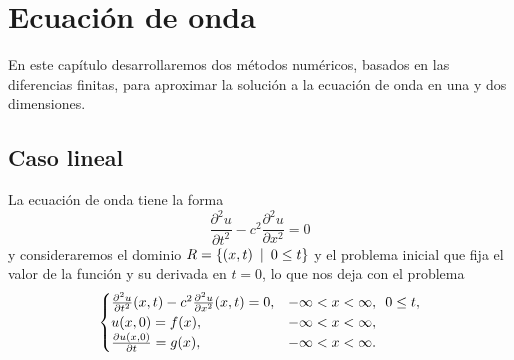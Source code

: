\chapter{Ecuación de onda}
\label{cap:wave}
\begin{resumen}
	En este capítulo desarrollaremos dos métodos numéricos, basados en las diferencias finitas, para aproximar la solución a la ecuación de onda en una  y dos dimensiones.
\end{resumen}

\section{Caso lineal}
La ecuación de onda tiene la forma
\begin{equation}
	\frac{\partial^2u}{\partial t^2} - c^2\frac{\partial^2u}{\partial x^2} = 0
\end{equation}
y consideraremos el dominio $R=\{(x,t) \hspace{5px} | \hspace{5px} 0\leq t\}$ y el problema inicial que fija el valor de la función y su derivada en $t=0$, lo que nos deja con el problema 
\begin{equation}
	\label{eq:1dwave}
\begin{cases}
	\frac{\partial^2u}{\partial t^2}(x,t) - c^2\frac{\partial^2u}{\partial x^2}(x,t) = 0, & -\infty < x < \infty, \hspace{5px} 0\leq t,\\
	u(x,0) = f(x), & -\infty < x < \infty, \\
	\frac{\partial u(x,0)}{\partial t} = g(x), & -\infty < x < \infty.
\end{cases}
\end{equation}
